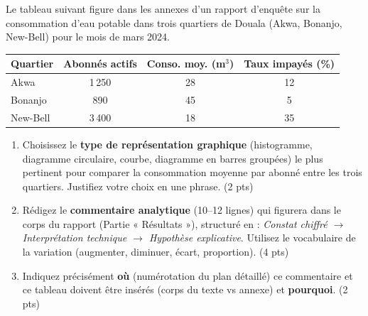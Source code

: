 \documentclass[11pt]{article}
\begin{document}
\begin{exercice}
Le tableau suivant figure dans les annexes d'un rapport d'enquête sur la consommation d'eau potable dans trois quartiers de Douala (Akwa, Bonanjo, New-Bell) pour le mois de mars 2024.

\begin{tabular}{|l|c|c|c|}
\hline
\textbf{Quartier} & \textbf{Abonnés actifs} & \textbf{Conso. moy. (m$^3$)} & \textbf{Taux impayés (\%)} \\
\hline
Akwa & 1\,250 & 28 & 12 \\
Bonanjo & 890 & 45 & 5 \\
New-Bell & 3\,400 & 18 & 35 \\
\hline
\end{tabular}

\begin{enumerate}
\item Choisissez le \textbf{type de représentation graphique} (histogramme, diagramme circulaire, courbe, diagramme en barres groupées) le plus pertinent pour comparer la consommation moyenne par abonné entre les trois quartiers. Justifiez votre choix en une phrase. \hfill (2 pts)
\item Rédigez le \textbf{commentaire analytique} (10--12 lignes) qui figurera dans le corps du rapport (Partie « Résultats »), structuré en : \textit{Constat chiffré $\rightarrow$ Interprétation technique $\rightarrow$ Hypothèse explicative}. Utilisez le vocabulaire de la variation (augmenter, diminuer, écart, proportion). \hfill (4 pts)
\item Indiquez précisément \textbf{où} (numérotation du plan détaillé) ce commentaire et ce tableau doivent être insérés (corps du texte vs annexe) et \textbf{pourquoi}. \hfill (2 pts)
\end{enumerate}
\end{exercice}
\end{document}
